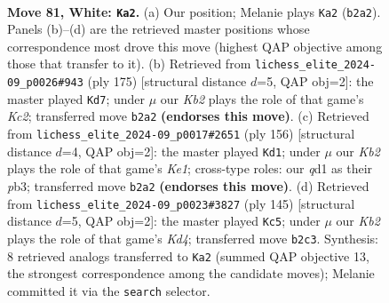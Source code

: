 \documentclass[11pt]{article}
\begin{document}
\clearpage

\begin{figure}[p]\centering
\begin{subfigure}{0.46\textwidth}\centering
\resizebox{\linewidth}{!}{%
\newchessgame
\chessboard[
  setfen={8/8/1p6/p5k1/2P5/8/1K6/3q4 w - - 18 81},
  showmover=false,
  pgfstyle=straightmove, color=movearrow, markmove={b2-a2}
]}
\caption{}
\end{subfigure}\hfill
\begin{subfigure}{0.46\textwidth}\centering
\resizebox{\linewidth}{!}{%
\newchessgame
\chessboard[
  setfen={8/2k5/p7/P2K4/1P6/8/8/8 b - - 14 88},
  showmover=false,
  pgfstyle=straightmove, color=movearrow, markmove={c7-d7}
]}
\caption{}
\end{subfigure}
\\[4pt]
\begin{subfigure}{0.46\textwidth}\centering
\resizebox{\linewidth}{!}{%
\newchessgame
\chessboard[
  setfen={8/8/8/3k2p1/5pP1/1p6/8/4K3 w - - 0 79},
  showmover=false,
  pgfstyle=straightmove, color=movearrow, markmove={e1-d1}
]}
\caption{}
\end{subfigure}\hfill
\begin{subfigure}{0.46\textwidth}\centering
\resizebox{\linewidth}{!}{%
\newchessgame
\chessboard[
  setfen={8/8/8/p2k4/P7/1P1K4/8/8 b - - 12 73},
  showmover=false,
  pgfstyle=straightmove, color=movearrow, markmove={d5-c5}
]}
\caption{}
\end{subfigure}
\caption{\textbf{Move 81, White: \texttt{Ka2}.} (a) Our position; Melanie plays \texttt{Ka2} (\texttt{b2a2}). Panels (b)--(d) are the retrieved master positions whose correspondence most drove this move (highest QAP objective among those that transfer to it). (b) Retrieved from \texttt{lichess\_elite\_2024-09\_p0026\#943} (ply 175) [structural distance $d$=5, QAP obj=2]: the master played \texttt{Kd7}; under $\mu$ our \emph{Kb2} plays the role of that game's \emph{Kc2}; transferred move \texttt{b2a2} \textbf{(endorses this move)}. (c) Retrieved from \texttt{lichess\_elite\_2024-09\_p0017\#2651} (ply 156) [structural distance $d$=4, QAP obj=2]: the master played \texttt{Kd1}; under $\mu$ our \emph{Kb2} plays the role of that game's \emph{Ke1}; cross-type roles: our \emph{q}d1 as their \emph{p}b3; transferred move \texttt{b2a2} \textbf{(endorses this move)}. (d) Retrieved from \texttt{lichess\_elite\_2024-09\_p0023\#3827} (ply 145) [structural distance $d$=5, QAP obj=2]: the master played \texttt{Kc5}; under $\mu$ our \emph{Kb2} plays the role of that game's \emph{Kd4}; transferred move \texttt{b2c3}. Synthesis: 8 retrieved analogs transferred to \texttt{Ka2} (summed QAP objective 13, the strongest correspondence among the candidate moves); Melanie committed it via the \texttt{search} selector.}
\label{fig:thought-m160}
\end{figure}
\end{document}
